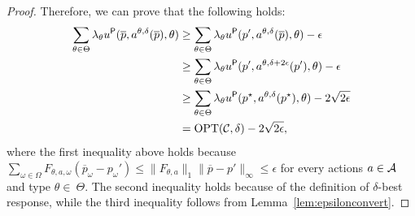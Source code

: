 \begin{proof}
	Therefore, we can prove that the following holds:
	\begin{align}
		\sum_{\theta \in \Theta } \lambda_\theta u^{\mathsf{P}}(\overline{p}, a^{\theta,\delta}(\overline{p}),\theta) &\ge \sum_{\theta \in \Theta } \lambda_\theta  u^{\mathsf{P}}(p', a^{\theta,\delta}(\overline{p}),\theta) - \epsilon \nonumber \\
		&\ge \sum_{\theta \in \Theta } \lambda_\theta  u^{\mathsf{P}}(p', a^{\theta,\delta+2\epsilon}(p'),\theta) - \epsilon \nonumber \\
		&\ge \sum_{\theta \in \Theta } \lambda_\theta  u^{\mathsf{P}}(p^\star, a^{\theta,\delta}(p^\star),\theta) - 2\sqrt{2\epsilon} \nonumber \\
		&= \textnormal{OPT}(\mathcal{C},\delta) - 2\sqrt{2\epsilon},\label{eq:eps_optimal}
	\end{align}
	where the first inequality above holds because $\sum_{\omega \in \Omega}F_{\theta, a, \omega} (\overline{p}_\omega-p_\omega') \le \|F_{\theta,a}\|_1 \|\overline{p}-p'\|_{\infty} \le \epsilon$ for every actions $a \in \mathcal{A}$ and type $\theta \in\ \Theta$. The second inequality holds because of the definition of $\delta$-best response, while the third inequality follows from Lemma~\ref{lem:epsilonconvert}.
	

\end{proof}
